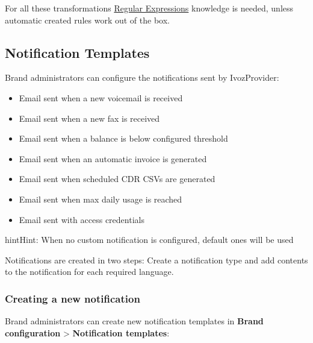 \documentclass[letterpaper,10pt,english]{sphinxmanual}
\begin{document}
For all these transformations \href{http://php.net/manual/en/reference.pcre.pattern.syntax.php}{Regular Expressions} knowledge
is needed, unless automatic created rules work out of the box.
\label{administration_portal/brand/settings/notification_templates:notification-templates}

\subsection{Notification Templates}
\label{administration_portal/brand/settings/notification_templates:id2}\label{administration_portal/brand/settings/notification_templates::doc}\label{administration_portal/brand/settings/notification_templates:notification-templates}\label{administration_portal/brand/settings/notification_templates:id1}
Brand administrators can configure the notifications sent by IvozProvider:
\begin{itemize}
\item {} 
Email sent when a new voicemail is received

\item {} 
Email sent when a new fax is received

\item {} 
Email sent when a balance is below configured threshold

\item {} 
Email sent when an automatic invoice is generated

\item {} 
Email sent when scheduled CDR CSVs are generated

\item {} 
Email sent when max daily usage is reached

\item {} 
Email sent with access credentials

\end{itemize}

\begin{notice}{hint}{Hint:}
When no custom notification is configured, default ones will be used
\end{notice}

Notifications are created in two steps: Create a notification type and add contents to the notification for each
required language.


\subsubsection{Creating a new notification}
\label{administration_portal/brand/settings/notification_templates:creating-a-new-notification}
Brand administrators can create new notification templates in \textbf{Brand configuration} \textgreater{} \textbf{Notification templates}:
\end{document}
